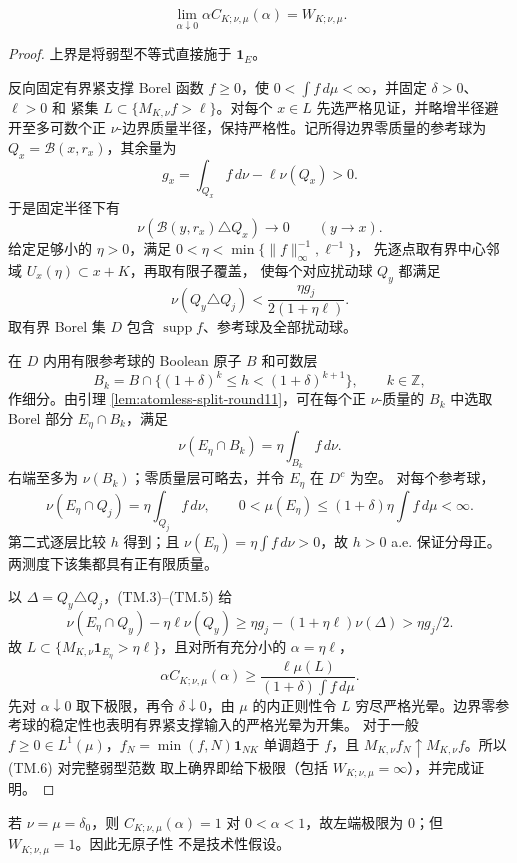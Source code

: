 \begin{theorem}[等价双测度弱型极限]\label{thm:two-measure-weak}
\[
 \lim_{\alpha\downarrow0}\alpha C_{K;\nu,\mu}(\alpha)=W_{K;\nu,\mu}.\tag{TM.2}
\]
\end{theorem}
\begin{proof}
上界是将弱型不等式直接施于 $\mathbf1_E$。

反向固定有界紧支撑 Borel 函数 $f\ge0$，使 $0<\int f\,d\mu<\infty$，并固定 $\delta>0$、$\ell>0$ 和
紧集 $L\subset\{M_{K,\nu}f>\ell\}$。对每个 $x\in L$ 先选严格见证，并略增半径避开至多可数个正 $\nu$-边界质量半径，保持严格性。记所得边界零质量的参考球为 $Q_x=\mathcal B(x,r_x)$，其余量为
\[
 g_x=\int_{Q_x}f\,d\nu-\ell\nu(Q_x)>0.
\]
于是固定半径下有
\[
 \nu(\mathcal B(y,r_x)\triangle Q_x)\longrightarrow0\qquad(y\to x).
\]
给定足够小的 $\eta>0$，满足
\(0<\eta<\min\{\|f\|_\infty^{-1},\ell^{-1}\}\)，
先逐点取有界中心邻域 $U_x(\eta)\subset x+K$，再取有限子覆盖，
使每个对应扰动球 $Q_y$ 都满足
\[
 \nu(Q_y\triangle Q_j)<\frac{\eta g_j}{2(1+\eta\ell)}.\tag{TM.3}
\]
取有界 Borel 集 $D$ 包含 $\operatorname{supp}f$、参考球及全部扰动球。

在 $D$ 内用有限参考球的 Boolean 原子 $B$ 和可数层
\[
 B_k=B\cap\{(1+\delta)^k\le h<(1+\delta)^{k+1}\},\qquad k\in\mathbb Z,
\]
作细分。由引理 \ref{lem:atomless-split-round11}，可在每个正 $\nu$-质量的 $B_k$ 中选取 Borel 部分
$E_\eta\cap B_k$，满足
\[
 \nu(E_\eta\cap B_k)=\eta\int_{B_k}f\,d\nu.\tag{TM.4}
\]
右端至多为 $\nu(B_k)$；零质量层可略去，并令 $E_\eta$ 在 $D^c$ 为空。
对每个参考球，
\[
 \nu(E_\eta\cap Q_j)=\eta\int_{Q_j}f\,d\nu,\qquad
 0<\mu(E_\eta)\le(1+\delta)\eta\int f\,d\mu<\infty.\tag{TM.5}
\]
第二式逐层比较 $h$ 得到；且 $\nu(E_\eta)=\eta\int f\,d\nu>0$，故 $h>0$ a.e. 保证分母正。两测度下该集都具有正有限质量。

以 $\Delta=Q_y\triangle Q_j$，(TM.3)--(TM.5) 给
\[
 \nu(E_\eta\cap Q_y)-\eta\ell\nu(Q_y)
 \ge\eta g_j-(1+\eta\ell)\nu(\Delta)>\eta g_j/2.
\]
故 $L\subset\{M_{K,\nu}\mathbf1_{E_\eta}>\eta\ell\}$，且对所有充分小的
\(\alpha=\eta\ell\)，
\[
 \alpha C_{K;\nu,\mu}(\alpha)
 \ge\frac{\ell\mu(L)}{(1+\delta)\int f\,d\mu}.\tag{TM.6}
\]
先对 $\alpha\downarrow0$ 取下极限，再令 $\delta\downarrow0$，由 $\mu$ 的内正则性令 $L$ 穷尽严格光晕。边界零参考球的稳定性也表明有界紧支撑输入的严格光晕为开集。
对于一般 $f\ge0\in L^1(\mu)$，$f_N=\min(f,N)\mathbf1_{NK}$ 单调趋于
$f$，且 $M_{K,\nu}f_N\uparrow M_{K,\nu}f$。所以 (TM.6) 对完整弱型范数
取上确界即给下极限（包括 $W_{K;\nu,\mu}=\infty$），并完成证明。
\end{proof}

\begin{remark}[无原子性不可删]\label{rem:two-measure-atom}
若 $\nu=\mu=\delta_0$，则 $C_{K;\nu,\mu}(\alpha)=1$ 对
$0<\alpha<1$，故左端极限为 $0$；但 $W_{K;\nu,\mu}=1$。因此无原子性
不是技术性假设。
\end{remark}
